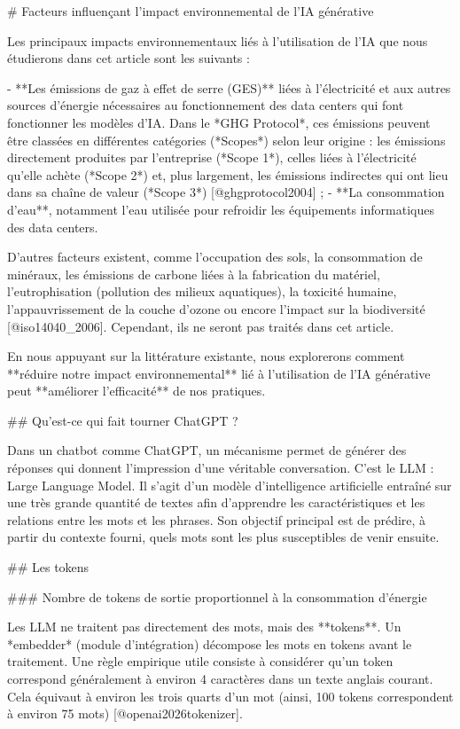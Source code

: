 # Facteurs influençant l'impact environnemental de l'IA générative

Les principaux impacts environnementaux liés à l'utilisation de l'IA que nous étudierons dans cet article sont les suivants :

- **Les émissions de gaz à effet de serre (GES)** liées à l'électricité et aux autres sources d'énergie nécessaires au fonctionnement des data centers qui font fonctionner les modèles d'IA. Dans le *GHG Protocol*, ces émissions peuvent être classées en différentes catégories (*Scopes*) selon leur origine : les émissions directement produites par l'entreprise (*Scope 1*), celles liées à l'électricité qu'elle achète (*Scope 2*) et, plus largement, les émissions indirectes qui ont lieu dans sa chaîne de valeur (*Scope 3*) [@ghgprotocol2004] ;
- **La consommation d'eau**, notamment l'eau utilisée pour refroidir les équipements informatiques des data centers.

D'autres facteurs existent, comme l'occupation des sols, la consommation de minéraux, les émissions de carbone liées à la fabrication du matériel, l'eutrophisation (pollution des milieux aquatiques), la toxicité humaine, l'appauvrissement de la couche d'ozone ou encore l'impact sur la biodiversité [@iso14040_2006]. Cependant, ils ne seront pas traités dans cet article.

En nous appuyant sur la littérature existante, nous explorerons comment **réduire notre impact environnemental** lié à l'utilisation de l'IA générative peut **améliorer l'efficacité** de nos pratiques.

## Qu'est-ce qui fait tourner ChatGPT ?

Dans un chatbot comme ChatGPT, un mécanisme permet de générer des réponses qui donnent l'impression d'une véritable conversation. C'est le LLM : Large Language Model. Il s'agit d'un modèle d'intelligence artificielle entraîné sur une très grande quantité de textes afin d'apprendre les caractéristiques et les relations entre les mots et les phrases. Son objectif principal est de prédire, à partir du contexte fourni, quels mots sont les plus susceptibles de venir ensuite.

## Les tokens

### Nombre de tokens de sortie proportionnel à la consommation d'énergie

Les LLM ne traitent pas directement des mots, mais des **tokens**. Un *embedder* (module d'intégration) décompose les mots en tokens avant le traitement. Une règle empirique utile consiste à considérer qu'un token correspond généralement à environ 4 caractères dans un texte anglais courant. Cela équivaut à environ les trois quarts d'un mot (ainsi, 100 tokens correspondent à environ 75 mots) [@openai2026tokenizer].

